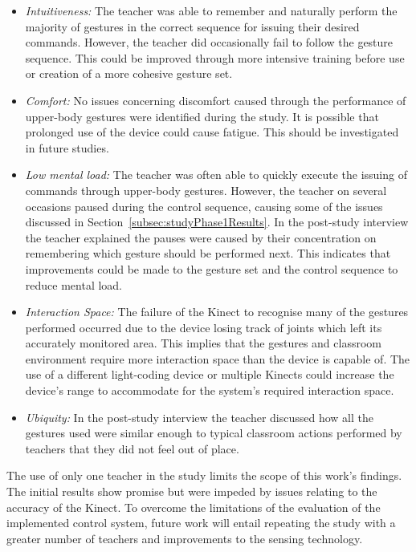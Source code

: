 \documentclass[link]{IWCOMP}
\begin{document}
\begin{itemize}
\item \textit{{Intuitiveness:}}  The teacher was able to remember and naturally perform the majority of gestures in the correct sequence for issuing their desired commands.
However, the teacher did occasionally fail to follow the gesture sequence.
This could be improved through more intensive training before use or creation of a more cohesive gesture set.
\item \textit{{Comfort:}}  No issues concerning discomfort caused through the performance of upper-body gestures were identified during the study.
It is possible that prolonged use of the device could cause fatigue.
This should be investigated in future studies.
\item \textit{{Low mental load:}}  The teacher was often able to quickly execute the issuing of commands through upper-body gestures.
However, the teacher on several occasions paused during the control sequence, causing some of the issues discussed in Section~\ref{subsec:studyPhase1Results}.
In the post-study interview the teacher explained the pauses were caused by their concentration on remembering which gesture should be performed next.
This indicates that improvements could be made to the gesture set and the control sequence to reduce mental load.
\item \textit{{Interaction Space:}} The failure of the Kinect to recognise many of the gestures performed occurred due to the device losing track of joints which left its accurately monitored area.
This implies that the gestures and classroom environment require more interaction space than the device is capable of.
The use of a different light-coding device or multiple Kinects could increase the device's range to accommodate for the system's required interaction space.
\item \textit{{Ubiquity:}} In the post-study interview the teacher discussed how all the gestures used were similar enough to typical classroom actions performed by teachers that they did not feel out of place.\\ 
\end{itemize}

The use of only one teacher in the study limits the scope of this work's findings.
The initial results show promise but were impeded by issues relating to the accuracy of the Kinect.
To overcome the limitations of the evaluation of the implemented control system, future work will entail repeating the study with a greater number of teachers and improvements to the sensing technology.
\end{document}
